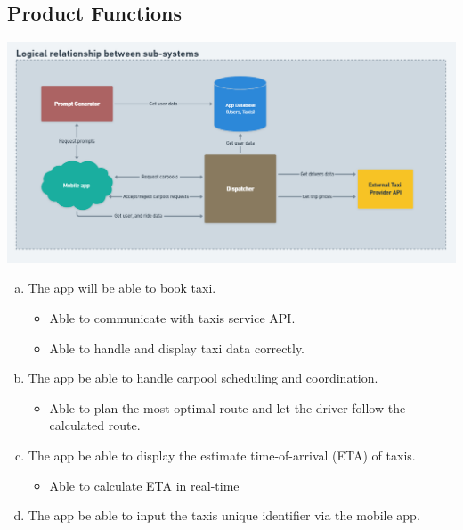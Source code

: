 \documentclass[]{article}
\begin{document}

\subsection{Product Functions}
\label{sub:product_functions}
	\begin{center}
		\includegraphics[scale=0.5]{subsys-relationship.png}
	\end{center}

\begin{enumerate}[a)]
	\item The app will be able to book taxi.

	\begin{itemize}
		\item Able to communicate with taxi\textquotesingle s service API.
		\item Able to handle and display taxi data correctly.	
	\end{itemize}
	\item The app be able to handle carpool scheduling and coordination.
	\begin{itemize}
		\item Able to plan the most optimal route and let the driver follow the calculated route.
	\end{itemize}
	\item The app be able to display the estimate time-of-arrival (ETA) of taxis.
	\begin{itemize}
		\item Able to calculate ETA in real-time
	\end{itemize}
	\item The app be able to input the taxi\textquotesingle s unique identifier via the mobile app.
\end{enumerate}

\end{document}
